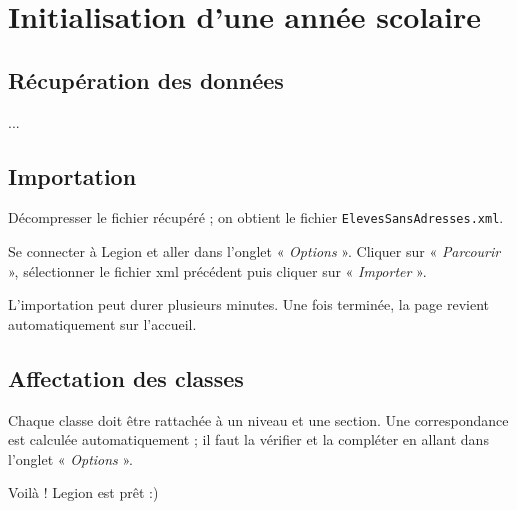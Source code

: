 \documentclass[11pt,a4paper]{article}
\newcommand{\bouton}[1]{« \textit{#1} »}
\begin{document}
\section{Initialisation d'une année scolaire}
\subsection{Récupération des données}
...

\subsection{Importation}
Décompresser le fichier récupéré ; on obtient le fichier \texttt{ElevesSansAdresses.xml}.

Se connecter à Legion et aller dans l'onglet \bouton{Options}. Cliquer sur \bouton{Parcourir}, sélectionner le fichier xml précédent puis cliquer sur \bouton{Importer}.

L'importation peut durer plusieurs minutes. Une fois terminée, la page revient automatiquement sur l'accueil.

\subsection{Affectation des classes}
Chaque classe doit être rattachée à un niveau et une section. Une correspondance est calculée automatiquement ; il faut la vérifier et la compléter en allant dans l'onglet \bouton{Options}.

Voilà ! Legion est prêt :)
\end{document}
